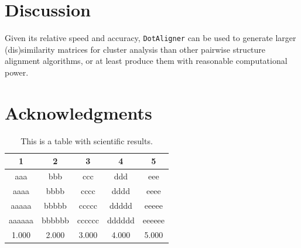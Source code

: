 \documentclass[a4paper,11pt]{article}
\newcommand\dotaligner{\texttt{DotAligner}}
\begin{document}
\section*{Discussion}

Given its relative speed and accuracy, \dotaligner{} can be used to generate larger 
(dis)similarity matrices for cluster analysis than other pairwise structure 
alignment algorithms, or at least produce them with reasonable computational 
power.  




 



\section{ Acknowledgments }




\begin{table}
\centering
\caption{This is a table with scientific results.}
\medskip
\begin{tabular}{ccccc}
\hline
1 & 2 & 3 & 4 & 5\\
\hline
aaa & bbb & ccc & ddd & eee\\
aaaa & bbbb & cccc & dddd & eeee\\
aaaaa & bbbbb & ccccc & ddddd & eeeee\\
aaaaaa & bbbbbb & cccccc & dddddd & eeeeee\\
1.000 & 2.000 & 3.000 & 4.000 & 5.000\\
\hline
\end{tabular}
\end{table}
\end{document}
